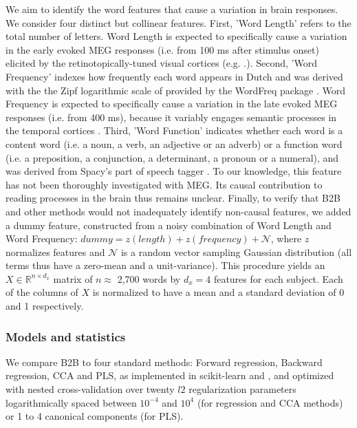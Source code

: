 We aim to identify the word features that cause a variation in brain responses.
We consider four distinct but collinear features.
%
First, 'Word Length' refers to the total number of letters. Word Length is
expected to specifically cause a variation in the early evoked MEG responses
(i.e. from 100 ms after stimulus onset) elicited by the retinotopically-tuned
visual cortices (e.g. \citep{pegado2014timing}.).
%
Second, 'Word Frequency' indexes how frequently each word appears in Dutch and
was derived with the the Zipf logarithmic scale of \citep{van2014subtlex}
provided by the WordFreq package \citep{speerwordfreq}. Word Frequency is
expected to specifically cause a variation in the late evoked MEG responses
(i.e. from 400 ms), because it variably engages semantic processes in the
temporal cortices \citep{kutas2011thirty}.
%
Third, 'Word Function' indicates whether each word is a content word (i.e. a
noun, a verb, an adjective or an adverb) or a function word (i.e. a preposition,
a conjunction, a determinant, a pronoun or a numeral), and was derived from
Spacy's part of speech tagger \citep{spacy2}. To our knowledge, this feature has
not been thoroughly investigated with MEG. Its causal contribution to reading
processes in the brain thus remains unclear.
%
Finally, to verify that B2B and other methods would not inadequately identify
non-causal features, we added a dummy feature, constructed from a noisy
combination of Word Length and Word Frequency: $dummy = z(length) + z(frequency)
+ \mathcal{N}$, where $z$ normalizes features and $\mathcal{N}$ is a random
vector sampling Gaussian distribution (all terms thus have a zero-mean and a
unit-variance). This procedure yields an $X \in \mathbb{R}^{n \times d_x}$
matrix of $n\approx$ 2,700 words by $d_x=4$ features for each subject. Each of
the columns of $X$ is normalized to have a mean and a standard deviation of 0
and 1 respectively.

\subsubsection{Models and statistics}

We compare B2B to four standard methods: Forward regression, Backward
regression, CCA and PLS, as implemented in scikit-learn \citep{sklearn} and
\citep{bilenko2016pyrcca}, and optimized with nested cross-validation over
twenty $l2$ regularization parameters logarithmically spaced between $10^{-4}$
and $10^4$ (for regression and CCA methods) or 1 to 4 canonical components (for
PLS).

